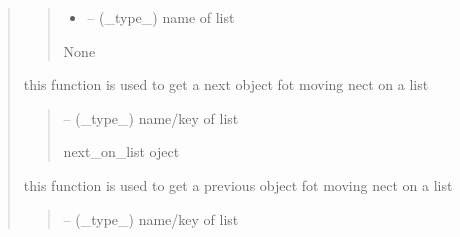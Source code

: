 \documentclass[letterpaper,10pt,english]{sphinxmanual}
\begin{document}
\begin{quote}
\begin{savenotes}
\begin{fulllineitems}
\begin{savenotes}
\begin{fulllineitems}
\begin{quote}
\begin{description}
\begin{itemize}
\item {} 
\sphinxAtStartPar
{} – (\_type\_) name of list

\end{itemize}

\sphinxAtStartPar
None

\end{description}\end{quote}

\end{fulllineitems}\end{savenotes}


\begin{savenotes}\begin{fulllineitems}
\label{\detokenize{setting/utils/move_on_list:oxin.utils.move_on_list.moveOnList.build_next_func}}
\pysigstartsignatures
{}
\pysigstopsignatures
\sphinxAtStartPar
this function is used to get a next object fot moving nect on a list
\begin{quote}\begin{description}
\sphinxAtStartPar
{} – (\_type\_) name/key of list

\sphinxAtStartPar
next\_on\_list oject

\end{description}\end{quote}

\end{fulllineitems}\end{savenotes}


\begin{savenotes}\begin{fulllineitems}
\label{\detokenize{setting/utils/move_on_list:oxin.utils.move_on_list.moveOnList.build_prev_func}}
\pysigstartsignatures
{}
\pysigstopsignatures
\sphinxAtStartPar
this function is used to get a previous object fot moving nect on a list
\begin{quote}\begin{description}
\sphinxAtStartPar
{} – (\_type\_) name/key of list


\end{description}
\end{quote}
\end{fulllineitems}
\end{savenotes}
\end{fulllineitems}
\end{savenotes}
\end{quote}
\end{document}
